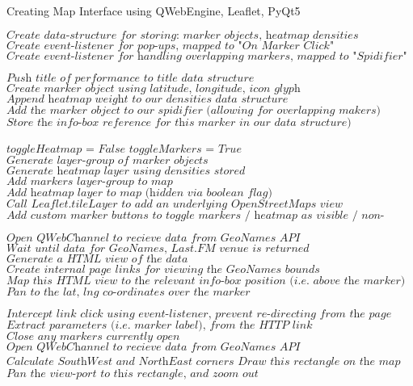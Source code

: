 \documentclass{article}
\begin{document}
\begin{algorithm}
\caption{Creating Map Interface using QWebEngine, Leaflet, PyQt5}
\begin{algorithmic}[1]
\State $\textit{Create data-structure for storing: marker objects, heatmap densities}$
\State $\textit{Create event-listener for pop-ups, mapped to "On Marker Click"}$
\State $\textit{Create event-listener for handling overlapping markers, mapped to "Spidifier" function}$
\EndProcedure
\end{algorithmic}

\begin{algorithmic}[1]
\State $\textit{Push title of performance to title data structure}$
\State $\textit{Create marker object using latitude, longitude, icon glyph}$
\State $\textit{Append heatmap weight to our densities data structure}$
\State $\textit{Add the marker object to our spidifier (allowing for overlapping makers)}$
\State $\textit{Store the info-box reference for this marker in our data structure)}$
\EndProcedure
\end{algorithmic}

\begin{algorithmic}[1]
\State $\textit{toggleHeatmap = False}$
\State $\textit{toggleMarkers = True}$
\State $\textit{Generate layer-group of marker objects}$
\State $\textit{Generate heatmap layer using densities stored}$
\State $\textit{Add markers layer-group to map}$
\State $\textit{Add heatmap layer to map (hidden via boolean flag)}$
\State $\textit{Call Leaflet.tileLayer to add an underlying OpenStreetMaps view}$
\State $\textit{Add custom marker buttons to toggle markers / heatmap as visible / non-visible}$
\EndProcedure
\end{algorithmic}

\begin{algorithmic}[1]
\State $\textit{Open QWebChannel to recieve data from GeoNames API}$
\State $\textit{Wait until data for GeoNames, Last.FM venue is returned}$
\State $\textit{Generate a HTML view of the data}$
\State $\textit{Create internal page links for viewing the GeoNames bounds}$
\State $\textit{Map this HTML view to the relevant info-box position (i.e. above the marker)}$
\State $\textit{Pan to the lat, lng co-ordinates over the marker}$
\EndProcedure
\end{algorithmic}

\begin{algorithmic}[1]
  \State $\textit{Intercept link click using event-listener, prevent re-directing from the page}$
  \State $\textit{Extract parameters (i.e. marker label), from the HTTP link}$
    \State $\textit{Close any markers currently open}$
    \State $\textit{Open QWebChannel to recieve data from GeoNames API}$
    \State $\textit{Calculate SouthWest and NorthEast corners}$
    \State $\textit{Draw this rectangle on the map}$
    \State $\textit{Pan the view-port to this rectangle, and zoom out}$
  \EndIf
\EndIf
\EndProcedure
\end{algorithmic}


\end{algorithm}
\end{document}

